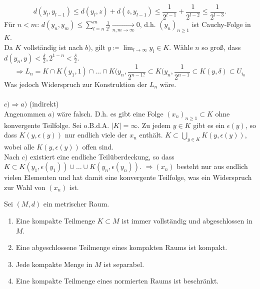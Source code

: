 \begin{beweis}
	\[ d(y_{l}, y_{l - 1}) \leq d(y_{l}, z) + d(z, y_{l - 1}) \leq \frac{1}{2^{l - 1}} + \frac{1}{2^{l - 2}} \leq \frac{1}{2^{l - 3}}. \]
	Für $n < m$: $d(y_{n}, y_{m}) \leq \sum_{l = n}^{m} \frac{1}{2^{l}} \xrightarrow[n, m \rightarrow \infty]{} 0$, d.h. $(y_{n})_{n \geq 1}$ ist Cauchy-Folge in $K$. \\
	Da $K$ vollständig ist nach $b)$, gilt $y \coloneqq \lim_{l \rightarrow \infty} y_{l} \in K$.
	Wähle $n$ so gro{\ss}, dass $d(y_{n}, y) < \frac{\delta}{2}, 2^{1-n} < \frac{\delta}{2}$. \\
	\[ \Rightarrow L_{n} = K \cap K(y_{1}, 1) \cap \dotsc \cap K(y_{n}, \frac{1}{2^{n - 1 ?}} \subset K(y_{n}, 	\frac{1}{2^{n - 1}} \subset K(y, \delta) \subset U_{i_{0}} \]
	Was jedoch Widerspruch zur Konstruktion der $L_{n}$ wäre. \\ \\
	$c) \Rightarrow a)$ (indirekt) \\
	Angenommen $a)$ wäre falsch. D.h. es gibt eine Folge $(x_{n})_{n \geq 1} \subset K$ ohne konvergente Teilfolge. Sei o.B.d.A. $|K| = \infty$. Zu jedem $y \in K$ gibt es ein $	\epsilon(y)$, so dass $K(y, \epsilon(y))$ nur endlich viele der $x_{n}$ enthält. $K \subset \bigcup_{y \in K} K(y, \epsilon(y))$, wobei alle $K(y, \epsilon(y))$ offen sind. \\
	Nach $c)$ existiert eine endliche Teilüberdeckung, so dass $K \subset K(y_{1}, \epsilon(y_{1})) \cup \dotsc \cup K(y_{n}, \epsilon(y_{n}))$.
	$\Rightarrow (x_{n})$ besteht nur aus endlich vielen Elementen und hat damit eine konvergente Teilfolge, was ein Widerspruch zur Wahl von $(x_{n})$ ist.
\end{beweis}

\begin{prop} \label{prop:6.6}
	Sei $(M, d)$ ein metrischer Raum.
	\begin{enumerate}[label=\alph*\upshape)]
		\item Eine kompakte Teilmenge $K \subset M$ ist immer vollständig und abgeschlossen in $M$.
		\item Eine abgeschlossene Teilmenge eines kompakten Raums ist kompakt.
		\item Jede kompakte Menge in $M$ ist separabel.
		\item Eine kompakte Teilmenge eines normierten Raums ist beschränkt.
	\end{enumerate}
\end{prop}

